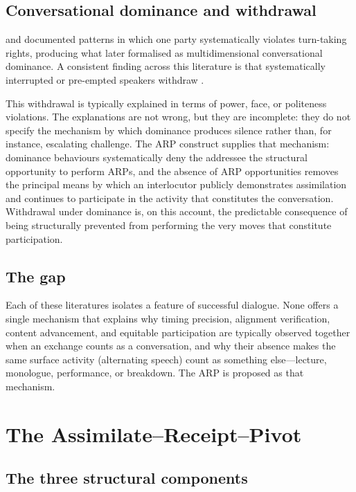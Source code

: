 \subsection{Conversational dominance and withdrawal}

\citet{ZimmermanWest1975} and \citet{WestZimmerman1983} documented patterns in which one party systematically violates turn-taking rights, producing what \citet{Linell1988} later formalised as multidimensional conversational dominance. A consistent finding across this literature is that systematically interrupted or pre-empted speakers withdraw \citep{Itakura2001,HancockRubin2015}.

This withdrawal is typically explained in terms of power, face, or politeness violations. The explanations are not wrong, but they are incomplete: they do not specify the mechanism by which dominance produces silence rather than, for instance, escalating challenge. The ARP construct supplies that mechanism: dominance behaviours systematically deny the addressee the structural opportunity to perform ARPs, and the absence of ARP opportunities removes the principal means by which an interlocutor publicly demonstrates assimilation and continues to participate in the activity that constitutes the conversation. Withdrawal under dominance is, on this account, the predictable consequence of being structurally prevented from performing the very moves that constitute participation.

\subsection{The gap}

Each of these literatures isolates a feature of successful dialogue. None offers a single mechanism that explains why timing precision, alignment verification, content advancement, and equitable participation are typically observed together when an exchange counts as a conversation, and why their absence makes the same surface activity (alternating speech) count as something else---lecture, monologue, performance, or breakdown. The ARP is proposed as that mechanism.

\section{The Assimilate--Receipt--Pivot}\label{sec:construct}

\subsection{The three structural components}

